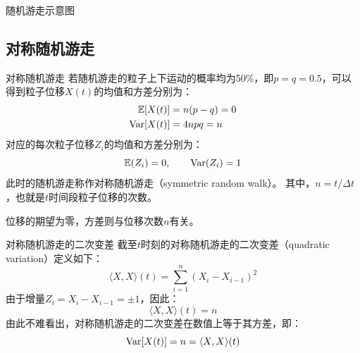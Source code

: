 \documentclass[t]{beamer}
\newcommand{\E}{\mathbb{E}}
\newcommand{\Var}{{\rm Var}}
\begin{document}
\begin{frame}{随机游走示意图}
  \centering
\end{frame}

\subsection{对称随机游走}
\begin{frame}{对称随机游走}
  若随机游走的粒子上下运动的概率均为50\%，即$p=q=0.5$，可以得到粒子位移$X(t)$的均值和方差分别为：
  \begin{equation*}
  \begin{split}
  \E[X(t)]&=n(p-q) = 0\\
  \Var[X(t)]&=4npq=n
  \end{split}
  \end{equation*}
  对应的每次粒子位移$Z_i$的均值和方差分别为：
  \begin{equation*}
  \E(Z_i)=0,\qquad \Var(Z_i)=1
  \end{equation*}
  此时的随机游走称作对称随机游走（symmetric random walk）。
其中，$n=t/\Delta t$，也就是$t$时间段粒子位移的次数。

\begin{block}{}\centering
  位移的期望为零，方差则与位移次数$n$有关。
\end{block}
\end{frame}

\begin{frame}{对称随机游走的二次变差}
  截至$t$时刻的对称随机游走的二次变差（quadratic variation）定义如下：
  \begin{equation*}
  \langle X,X\rangle(t) =\sum^{n}_{i=1}(X_i-X_{i-1})^2
  \end{equation*}
  由于增量$Z_i=X_i-X_{i-1}=\pm 1$，因此：
  \begin{equation*}
  \langle X,X\rangle(t) =n
  \end{equation*}
  由此不难看出，对称随机游走的二次变差在数值上等于其方差，即：
  \begin{equation*}
  \Var[X(t)]=n=\langle X,X\rangle(t)
  \end{equation*}
\end{frame}
\end{document}
